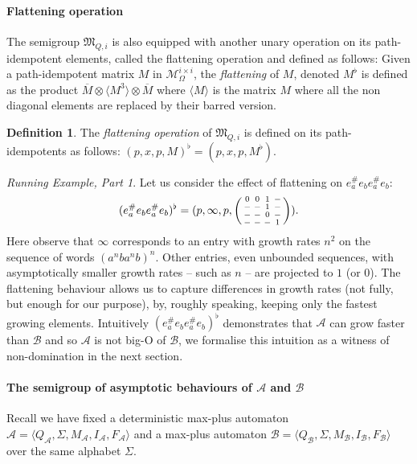 \documentclass[10pt,a4paper]{amsart}
\theoremstyle{definition}
\newtheorem{defi}[defi]{Definition}
\numberwithin{equation}{section}
\theoremstyle{remark}
\newcommand{\matricesOm}[2]{\mathcal{M}^{#1 \times #2}_\Omega}
\newcommand{\ideal}{\mathfrak{M}}
\newcommand{\autA}{\mathcal{A}}
\newcommand{\autB}{\mathcal{B}}
\newcommand{\nopath}{-}
\newenvironment{smallpmatrix}
  {\left(\begin{smallmatrix}}
  {\end{smallmatrix}\right)}
\theoremstyle{remark}
\newtheorem{runningexample/}{Running Example, Part}
\newenvironment{runningexample}
  {\renewcommand{\qedsymbol}{\color{darkgray}\ensuremath{\lrcorner}}%
   \pushQED{\qed}\begin{runningexample/}}
  {\popQED\end{runningexample/}}
\begin{document}
\paragraph*{Flattening operation}
The semigroup $\ideal_{Q,i}$ is also equipped with another unary operation on its path-idempotent elements, called the flattening operation and defined as follows: Given a path-idempotent matrix $M$ in $\matricesOm{i}{i}$, the \emph{flattening} of $M$, denoted $M^\flat$ is defined as the product $\overline{M}\otimes \langle M^3 \rangle \otimes \overline{M}$ where $\langle M \rangle$ is the matrix $M$ where all the non diagonal elements are replaced by their barred version.

\begin{defi}\label{def:op:flat}
The \emph{flattening operation} of $\ideal_{Q,i}$ is defined on its path-idempotents as follows: $(p,x,p,M)^\flat = (p,x,p,M^\flat)$.
\end{defi}

\begin{runningexample}
Let us consider the effect of flattening on $e_a^\#e_be_a^\#e_b$:
 \[
(e_a^\#e_be_a^\#e_b)^\flat= (p,\infty,p,
\begin{smallpmatrix}
0 & 0 & 1 & \nopath\\
\nopath & \nopath & 1 & \nopath\\
\nopath & \nopath & 0 & \nopath\\
\nopath & \nopath & \nopath & 1
\end{smallpmatrix}).
\]
Here observe that $\infty$ corresponds to an entry with growth rates $n^2$ on the sequence of words $(a^nba^nb)^n$. Other entries, even unbounded sequences, with asymptotically smaller growth rates -- such as $n$ -- are projected to $1$ (or $0$). The flattening behaviour allows us to capture differences in growth rates (not fully, but enough for our purpose), by, roughly speaking, keeping only the fastest growing elements. Intuitively $(e_a^\#e_be_a^\#e_b)^\flat$ demonstrates that $\autA$ can grow faster than $\autB$ and so $\autA$ is not big-O of $\autB$, we formalise this intuition as a witness of non-domination in the next section.
\end{runningexample}

\paragraph*{The semigroup of asymptotic behaviours of $\autA$ and $\autB$}

Recall we have fixed a deterministic max-plus automaton $\autA = \langle Q_\autA, \Sigma, M_\autA, I_\autA, F_\autA\rangle$ and a max-plus automaton $\autB = \langle Q_\autB, \Sigma, M_\autB, I_\autB, F_\autB\rangle$ over the same alphabet $\Sigma$.
\end{document}
